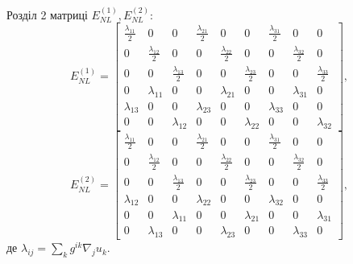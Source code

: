 \documentclass[8pt]{beamer}
\numberwithin{figure}{section}
\numberwithin{equation}{section}
\numberwithin{table}{section}
\begin{document}
\begin{frame}{Розділ 2}
матриці $E_{NL}^{(1)}, E_{NL}^{(2)}$:
\begin{equation}
E_{NL}^{(1)}=\left[\begin{matrix}
\frac{\lambda_{11}}{2} & 0 & 0 & \frac{\lambda_{21}}{2} & 0 & 0 & \frac{\lambda_{31}}{2} & 0 & 0\\
0 & \frac{\lambda_{12}}{2} & 0 & 0 & \frac{\lambda_{22}}{2} & 0 & 0 & \frac{\lambda_{32}}{2} & 0\\
0 & 0 & \frac{\lambda_{13}}{2} & 0 & 0 & \frac{\lambda_{23}}{2} & 0 & 0 & \frac{\lambda_{33}}{2}\\
0 & \lambda_{11} & 0 & 0 & \lambda_{21} & 0 & 0 & \lambda_{31} & 0\\
\lambda_{13} & 0 & 0 & \lambda_{23} & 0 & 0 & \lambda_{33} & 0 & 0\\
0 & 0 & \lambda_{12} & 0 & 0 & \lambda_{22} & 0 & 0 & \lambda_{32}
\end{matrix}\right],
\end{equation}
\begin{equation}
E_{NL}^{(2)}=\left[\begin{matrix}
\frac{\lambda_{11}}{2} & 0 & 0 & \frac{\lambda_{21}}{2} & 0 & 0 & \frac{\lambda_{31}}{2} & 0 & 0\\
0 & \frac{\lambda_{12}}{2} & 0 & 0 & \frac{\lambda_{22}}{2} & 0 & 0 & \frac{\lambda_{32}}{2} & 0\\
0 & 0 & \frac{\lambda_{13}}{2} & 0 & 0 & \frac{\lambda_{23}}{2} & 0 & 0 & \frac{\lambda_{33}}{2}\\
\lambda_{12} & 0 & 0 & \lambda_{22} & 0 & 0 & \lambda_{32} & 0 & 0\\
0 & 0 & \lambda_{11} & 0 & 0 & \lambda_{21} & 0 & 0 & \lambda_{31}\\
0 & \lambda_{13} & 0 & 0 & \lambda_{23} & 0 & 0 & \lambda_{33} & 0
\end{matrix}\right],
\end{equation}
де
$ \lambda_{ij}=\sum_k g^{ik}\nabla_j u_k $.

\end{frame}
\end{document}
